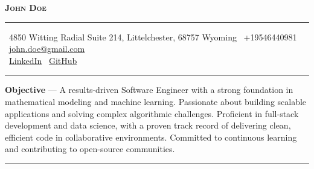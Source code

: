 \documentclass[a4paper,11pt]{article}
\begin{document}

\begin{center}
    {\Huge \textbf{\scshape John Doe}}\\[3pt]
    \color{black}\rule{0.5\linewidth}{0.8pt}
\end{center}

\vspace{0.6em}

\begin{center}
    \faMapMarker*~4850 Witting Radial Suite 214, Littelchester, 68757 Wyoming \quad
    \faPhone*~+19546440981 \quad
    \faEnvelope~\href{mailto:john.doe@gmail.com}{john.doe@gmail.com}\\[3pt]
    \faLinkedin~\href{https://www.linkedin.com/}{LinkedIn} \quad
    \faGithub~\href{https://github.com}{GitHub}
\end{center}

\vspace{0.8em}
\hrule
\vspace{0.8em}


\textbf{Objective} — A results-driven Software Engineer with a strong foundation in mathematical modeling 
and machine learning. Passionate about building scalable applications and solving complex algorithmic challenges. 
Proficient in full-stack development and data science, with a proven track record of delivering clean, 
efficient code in collaborative environments. Committed to continuous learning and contributing to open-source 
communities.

\vspace{0.8em}
\hrule
\vspace{0.8em}

\end{document}
